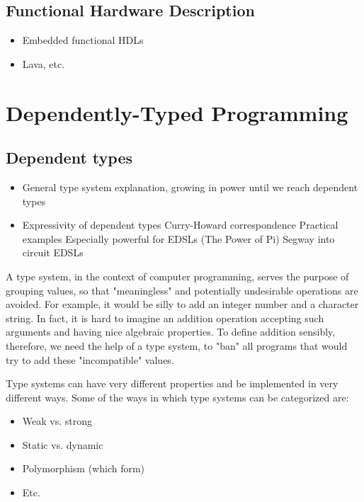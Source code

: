 \documentclass[a4paper,draft]{report}
\begin{document}
        \section{Functional Hardware Description}
        \label{sec:functional-hardware}
            \begin{itemize}
                \item Embedded functional HDLs
                \item Lava, etc.
            \end{itemize}


    \chapter{Dependently-Typed Programming}
    \label{chap:dtp}

        \section{Dependent types}
        \label{sec:dependent-types}
            \begin{itemize}
                \item General type system explanation, growing in power until we reach dependent types
                \item Expressivity of dependent types
                    \subitem Curry-Howard correspondence
                    \subitem Practical examples
                        \subsubitem Especially powerful for EDSLs (The Power of Pi)
                        \subsubitem Segway into circuit EDSLs
            \end{itemize}

            A type system, in the context of computer programming,
            serves the purpose of grouping values, so that "meaningless" and potentially undesirable operations are avoided.
            For example, it would be silly to add an integer number and a character string.
            In fact, it is hard to imagine an addition operation accepting such arguments and having nice algebraic properties.
            To define addition sensibly, therefore, we need the help of a type system, to "ban" all programs that would
            try to add these "incompatible" values.

            Type systems can have very different properties and be implemented in very different ways.
            Some of the ways in which type systems can be categorized are:
            \begin{itemize}
                \item Weak vs. strong
                \item Static vs. dynamic
                \item Polymorphism (which form)
                \item Etc.
            \end{itemize}
\end{document}
